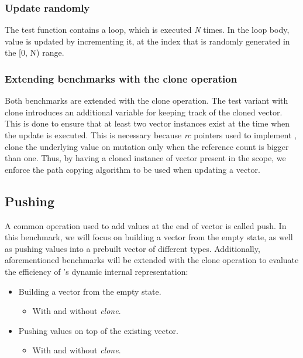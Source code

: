 \subsubsection*{Update randomly}
The test function contains a loop, which is executed \emph{N} times. In the loop body, value is updated by incrementing it, at the index that is randomly generated in the [0, N) range. 

\subsubsection*{Extending benchmarks with the clone operation}
Both benchmarks are extended with the clone operation. The test variant with clone introduces an additional variable for keeping track of the cloned vector. This is done to ensure that at least two vector instances exist at the time when the update is executed. This is necessary because \emph{rc} pointers used to implement \rbtree{}, clone the underlying value on mutation only when the reference count is bigger than one. Thus, by having a cloned instance of vector present in the scope, we enforce the path copying algorithm to be used when updating a vector. 

\subsection{Pushing}
A common operation used to add values at the end of vector is called push. In this benchmark, we will focus on building a vector from the empty state, as well as pushing values into a prebuilt vector of different types. Additionally, aforementioned benchmarks will be extended with the clone operation to evaluate the efficiency of \pvec{}'s dynamic internal representation:
\begin{itemize}
    \item Building a vector from the empty state.    
    \begin{itemize}
        \item With and without \emph{clone}. 
    \end{itemize}
    \item Pushing values on top of the existing vector.
    \begin{itemize}
        \item With and without \emph{clone}. 
    \end{itemize}
\end{itemize}

